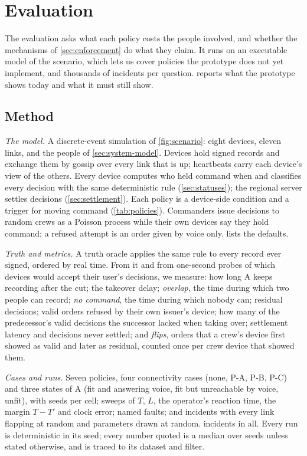 \section{Evaluation}
\label{sec:eval}

The evaluation asks what each policy costs the people involved, and whether the mechanisms
of \cref{sec:enforcement} do what they claim. It runs on an executable model of the
scenario, which lets us cover policies the prototype does not yet implement, and thousands
of incidents per question.  reports what the prototype shows today
and what it must still show.

\subsection{Method}
\label{sec:eval-method}

\textit{The model.} A discrete-event simulation of \cref{fig:scenario}: eight devices,
eleven links, and the people of \cref{sec:system-model}. Devices hold signed records and
exchange them by gossip over every link that is up; heartbeats carry each device's view of
the others. Every device computes who held command when and classifies every decision with
the same deterministic rule (\cref{sec:statuses}); the regional server settles decisions
(\cref{sec:settlement}). Each policy is a device-side condition and a trigger for moving
command (\cref{tab:policies}). Commanders issue decisions to random crews as a Poisson
process while their own devices say they hold command; a refused attempt is an order given
by voice only.  lists the defaults.

\textit{Truth and metrics.} A truth oracle applies the same rule to every record ever
signed, ordered by real time. From it and from one-second probes of which devices would
accept their user's decisions, we measure: how long A keeps recording after the cut; the
takeover delay; \emph{overlap}, the time during which two people can record; \emph{no
command}, the time during which nobody can; residual decisions; valid orders refused by
their own issuer's device; how many of the predecessor's valid decisions the successor
lacked when taking over; settlement latency and decisions never settled; and
\emph{flips}, orders that a crew's device first showed as valid and later as residual,
counted once per crew device that showed them.

\textit{Cases and runs.} Seven policies, four connectivity cases (none, P-A, P-B, P-C) and
three states of A (fit and answering voice, fit but unreachable by voice, unfit), with
\tbSeedsPerCell{} seeds per cell; sweeps of $T$, $L$, the operator's reaction time, the
margin $T - T'$ and clock error; named faults; and \tbSearchRuns{} incidents with every link
flapping at random and parameters drawn at random. \tbTotalRuns{} incidents in all. Every
run is deterministic in its seed; every number quoted is a median over seeds unless stated
otherwise, and is traced to its dataset and filter. 

